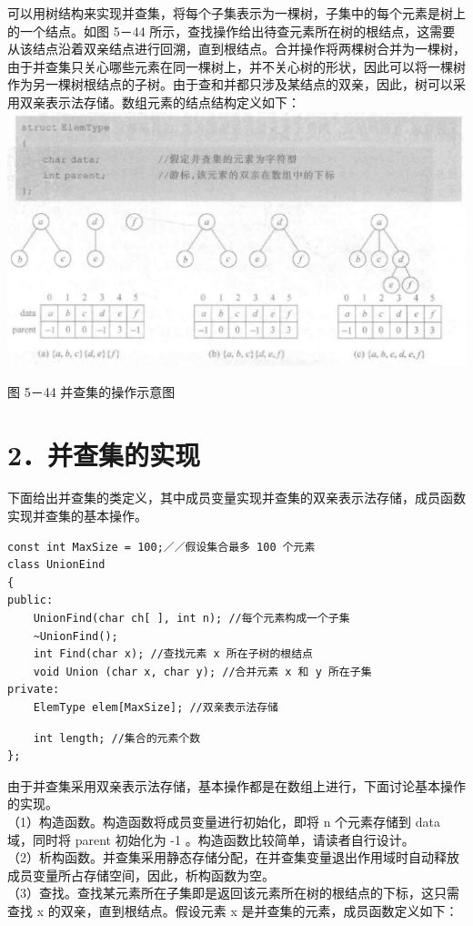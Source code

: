 \documentclass[10pt]{article}
\begin{document}
可以用树结构来实现并查集，将每个子集表示为一棵树，子集中的每个元素是树上的一个结点。如图 5－44 所示，查找操作给出待查元素所在树的根结点，这需要从该结点沿着双亲结点进行回溯，直到根结点。合并操作将两棵树合并为一棵树，由于并查集只关心哪些元素在同一棵树上，并不关心树的形状，因此可以将一棵树作为另一棵树根结点的子树。由于查和并都只涉及某结点的双亲，因此，树可以采用双亲表示法存储。数组元素的结点结构定义如下：\\
\includegraphics[max width=\textwidth, center]{2025_06_06_704745ea57b15b2333e5g-178}

图 5－44 并查集的操作示意图

\section*{2．并查集的实现}
下面给出并查集的类定义，其中成员变量实现并查集的双亲表示法存储，成员函数实现并查集的基本操作。

\begin{verbatim}
const int MaxSize = 100;／／假设集合最多 100 个元素
class UnionEind
{
public:
    UnionFind(char ch[ ], int n); //每个元素构成一个子集
    ~UnionFind();
    int Find(char x); //查找元素 x 所在子树的根结点
    void Union (char x, char y); //合并元素 x 和 y 所在子集
private:
    ElemType elem[MaxSize]; //双亲表示法存储
\end{verbatim}

\begin{verbatim}
    int length; //集合的元素个数
};
\end{verbatim}

由于并查集采用双亲表示法存储，基本操作都是在数组上进行，下面讨论基本操作的实现。\\
（1）构造函数。构造函数将成员变量进行初始化，即将 n 个元素存储到 data 域，同时将 parent 初始化为 -1 。构造函数比较简单，请读者自行设计。\\
（2）析构函数。并查集采用静态存储分配，在并查集变量退出作用域时自动释放成员变量所占存储空间，因此，析构函数为空。\\
（3）查找。查找某元素所在子集即是返回该元素所在树的根结点的下标，这只需查找 x 的双亲，直到根结点。假设元素 x 是并查集的元素，成员函数定义如下：
\end{document}
